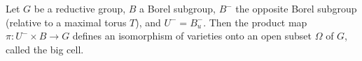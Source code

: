 Let $G$ be a reductive group, $B$ a Borel subgroup, $B^{-}$ the opposite Borel subgroup (relative to a maximal torus $T$), and $U^{-} = B^{-}_u$. Then the product map $\pi: U^{-} \times B \rightarrow G$ defines an isomorphism of varieties onto an open subset $\Omega$ of $G$, called the big cell.
